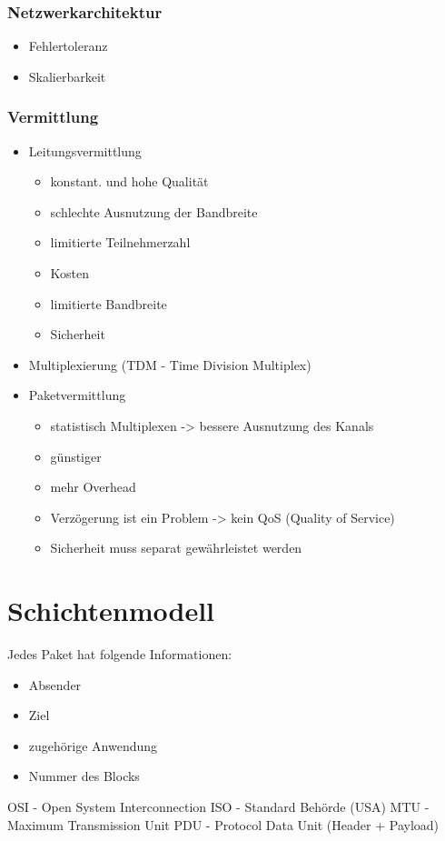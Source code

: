 \documentclass[11pt,a4paper]{article}
\begin{document}
\subsubsection{Netzwerkarchitektur}
\begin{itemize}
\item Fehlertoleranz
\item Skalierbarkeit
\end{itemize}
\subsubsection{Vermittlung}
\begin{itemize}
\item Leitungsvermittlung
    \begin{itemize}
    \item konstant. und hohe Qualität
    \item schlechte Ausnutzung der Bandbreite
    \item limitierte Teilnehmerzahl
    \item Kosten
    \item limitierte Bandbreite
    \item Sicherheit
    \end{itemize}
\item Multiplexierung (TDM - Time Division Multiplex)
\item Paketvermittlung
    \begin{itemize}
    \item statistisch Multiplexen -> bessere Ausnutzung des Kanals
    \item günstiger
    \item mehr Overhead
    \item Verzögerung ist ein Problem -> kein QoS (Quality of Service)
    \item Sicherheit muss separat gewährleistet werden
    \end{itemize}
\end{itemize}

\section{Schichtenmodell}
Jedes Paket hat folgende Informationen:
\begin{itemize}
\item Absender
\item Ziel
\item zugehörige Anwendung
\item Nummer des Blocks
\end{itemize}
OSI - Open System Interconnection\linebreak
ISO - Standard Behörde (USA)\linebreak
MTU - Maximum Transmission Unit\linebreak
PDU - Protocol Data Unit (Header + Payload)\linebreak
\end{document}
